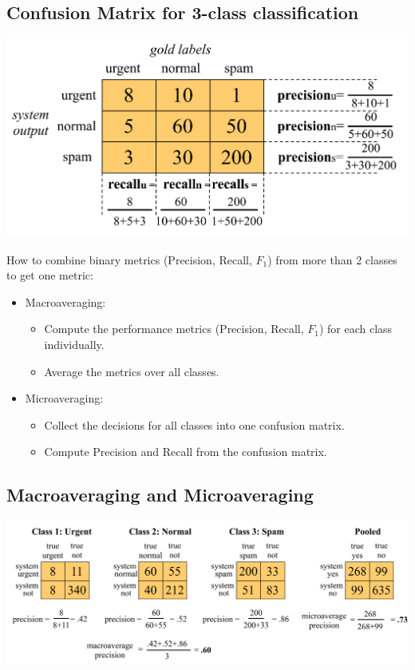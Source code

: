 \subsection{Confusion Matrix for 3-class classification}


\begin{center}
\includegraphics[scale=0.23]{pics/confmatrix.png}
\end{center}


How to combine binary metrics (Precision, Recall, $F_1$) from more than 2 classes to get one metric:
\begin{itemize}
 \item Macroaveraging:
 \begin{itemize}
    \item Compute the performance metrics (Precision, Recall, $F_1$) for each class individually.
    \item Average the metrics over all classes.
 \end{itemize}
 \item Microaveraging:
 \begin{itemize}
    \item Collect the decisions for all classes into one confusion matrix.
    \item Compute Precision and Recall from the confusion matrix.
 \end{itemize}
\end{itemize}



\subsection{Macroaveraging and Microaveraging}


\begin{center}
\includegraphics[scale=0.23]{pics/confmatrixmulti.png}
\end{center}
